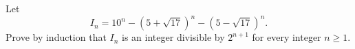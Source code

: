 Let
\[I_n=10^n-\left(5+\sqrt{17}\right)^n-\left(5-\sqrt{17}\right)^n.\]
Prove by induction that $I_n$ is an integer divisible by $2^{n+1}$ for every integer $n\ge1$.
